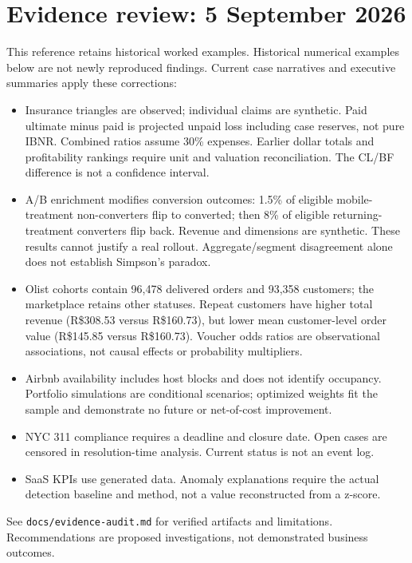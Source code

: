 





\frontmatter
\chapter*{Evidence review: 5 September 2026}
This reference retains historical worked examples. Historical numerical
examples below are not newly reproduced findings. Current case narratives
and executive summaries apply these corrections:
\begin{itemize}
\item Insurance triangles are observed; individual claims are synthetic.
Paid ultimate minus paid is projected unpaid loss including case reserves,
not pure IBNR. Combined ratios assume 30\% expenses. Earlier dollar totals
and profitability rankings require unit and valuation reconciliation.
The CL/BF difference is not a confidence interval.
\item A/B enrichment modifies conversion outcomes: 1.5\% of eligible
mobile-treatment non-converters flip to converted; then 8\% of eligible
returning-treatment converters flip back. Revenue and dimensions are synthetic.
These results cannot justify a real rollout. Aggregate/segment disagreement
alone does not establish Simpson's paradox.
\item Olist cohorts contain 96,478 delivered orders and 93,358 customers;
the marketplace retains other statuses. Repeat customers have higher total
revenue (R\$308.53 versus R\$160.73), but lower mean customer-level order
value (R\$145.85 versus R\$160.73). Voucher odds ratios are observational
associations, not causal effects or probability multipliers.
\item Airbnb availability includes host blocks and does not identify occupancy.
Portfolio simulations are conditional scenarios; optimized weights fit the
sample and demonstrate no future or net-of-cost improvement.
\item NYC 311 compliance requires a deadline and closure date. Open cases
are censored in resolution-time analysis. Current status is not an event log.
\item SaaS KPIs use generated data. Anomaly explanations require the actual
detection baseline and method, not a value reconstructed from a z-score.
\end{itemize}
See \texttt{docs/evidence-audit.md} for verified artifacts and limitations.
Recommendations are proposed investigations, not demonstrated business outcomes.

